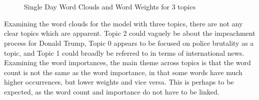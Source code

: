 \begin{figure}[H]
	\centering
	\\
	\\
	
	\caption{Single Day Word Clouds and Word Weights for 3 topics}
	\label{fig:single3}
\end{figure}

Examining the word clouds for the model with three topics, there are not any clear topics which are apparent. Topic 2 could vaguely be about the impeachment process for Donald Trump, Topic 0 appears to be focused on police brutality as a topic, and Topic 1 could broadly be referred to in terms of international news. Examining the word importances, the main theme across topics is that the word count is not the same as the word importance, in that some words have much higher occurrences, but lower weights and vice versa. This is perhaps to be expected, as the word count and importance do not have to be linked.

